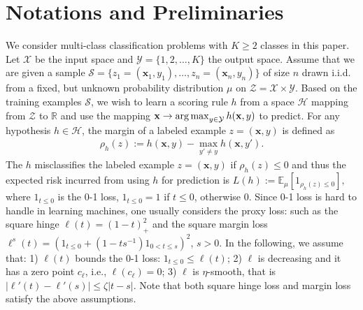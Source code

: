 \documentclass{article}
\newcommand{\argmax}{\operatornamewithlimits{arg\,max}}
\newtheorem{definition}{Definition}
\begin{document}
\section{Notations and Preliminaries}
We consider multi-class classification problems with $K\geq 2$ classes in this paper.
Let $\mathcal{X}$ be the input space and $\mathcal{Y}=\{1,2,\ldots,K\}$ the output space.
Assume that we are given a sample
$
  \mathcal{S}=\{z_1=(\mathbf  x_1,y_1),\ldots, z_n=(\mathbf  x_n,y_n)\}
$
of size $n$ drawn i.i.d. from a fixed,
but unknown probability distribution $\mu$ on $\mathcal{Z}=\mathcal{X}\times\mathcal{Y}$.
Based on the training examples $\mathcal{S}$,
we wish to learn a scoring rule $h$ from a space $\mathcal{H}$ mapping from $\mathcal{Z}$ to $\mathbb{R}$
and use the mapping $\mathbf x\rightarrow \argmax_{y\in\mathcal{Y}} h(\mathbf x,y)$ to predict.
For any hypothesis $h\in\mathcal{H}$,
the margin of a labeled example $z=(\mathbf x,y)$ is defined as
\begin{align*}
  \rho_h(z):= h(\mathbf x,y)-\max_{y'\not =y} h(\mathbf x,y').
\end{align*}
The $h$ misclassifies the labeled example $z=(\mathbf x,y)$
if $\rho_h(z)\leq 0$ and thus the expected risk incurred
from using $h$ for prediction is
$
  L(h):=\mathbb{E}_\mu[1_{\rho_h(z)\leq 0}],
$
where $1_{t\leq 0}$ is the 0-1 loss,
$1_{t\leq 0}=1$ if $t\leq 0$, otherwise 0.
Since 0-1 loss is hard to handle in learning machines,
one usually considers the proxy loss:
such as the square hinge $\ell(t)=(1-t)_+^2$ and the square margin loss $\ell^s(t)=\left(1_{t\leq 0}+(1-ts^{-1})1_{0<t\leq s}\right)^2$, $s>0$.
In the following, we assume that:
1) $\ell(t)$ bounds the 0-1 loss: $1_{t\leq 0}\leq \ell(t)$;
2) $\ell$ is decreasing and it has a zero point $c_\ell$, i.e., $\ell(c_\ell)=0$;
3) $\ell$ is $\eta$-smooth, that is $|\ell'(t)-\ell'(s)|\leq \zeta|t-s|$.
Note that both square hinge loss and margin loss satisfy the above assumptions.
\end{document}
